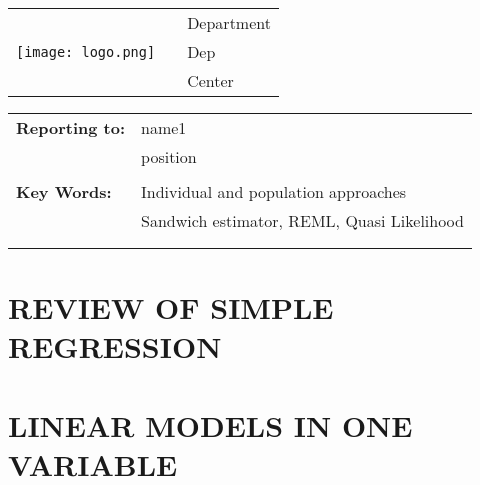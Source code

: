 \documentclass[letterpaper,11pt]{article}
\begin{document}


\vspace{-25pt}%

\begin{tabular}[t]{lp{1in}l}
	\multirow{5}{*}{\texttt{[image: logo.png]}} && Department \leavevmode  \\
																								&& Dep \\
																								&& Center\\
\end{tabular}


\leavevmode \newline \vspace{15pt} \newline\vspace{0.015in}

\begin{tabular}[h!]{p{2in} p{10in}}
	\rule{0pt}{4ex}\textbf{Reporting to:}          & name1  \\
																							   & position \\
                                                 & \\
	\rule{0pt}{4ex}\textbf{Key Words:}  					 & Individual and population approaches\\
																								 & Sandwich estimator, REML, Quasi Likelihood \\
 \mbox{$\quad$} \\
 \mbox{$\quad$} \\
\end{tabular}

\newpage
\noindent 


\section*{REVIEW OF SIMPLE REGRESSION}

\section{LINEAR MODELS IN ONE VARIABLE}
\end{document}
